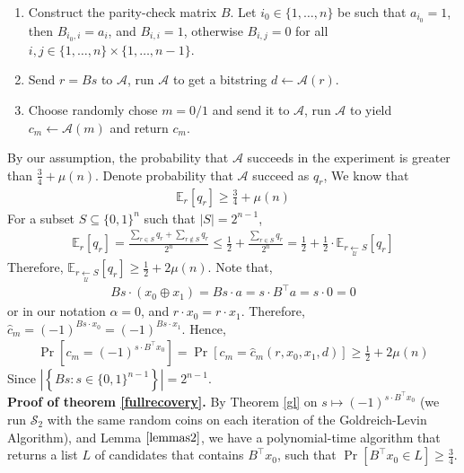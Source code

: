 \documentclass{article}
\begin{document}
\begin{enumerate}
    \item Construct the parity-check matrix $B$. Let $i_{0}\in\{1,\dots,n\}$ be such that $a_{i_{0}}=1$, then $B_{i_{0},i}=a_{i}$, and $B_{i,i}=1$, otherwise $B_{i,j}=0$ for all $i,j\in \{1,\dots,n\}\times \{1,\dots,n-1\}$.
    \item Send $r=Bs$ to $\mathcal{A}$, run $\mathcal{A}$ to get a bitstring $d\leftarrow \mathcal{A}(r)$.
    \item Choose randomly chose $m=0/1$ and send it to $\mathcal{A}$, run $\mathcal{A}$ to yield $c_{m}\leftarrow\mathcal{A}(m)$ and return $c_{m}$.
\end{enumerate}
By our assumption, the probability that $\mathcal{A}$ succeeds in the experiment is greater than $\frac{3}{4}+\mu(n)$. Denote probability that $\mathcal{A}$ succeed as $q_{r}$, We know that \begin{align}\mathbb{E}_{r}[q_{r}] \geq \frac{3}{4}+\mu(n)\end{align}  For a subset $S\subseteq \{0,1\}^{n}$ such that $|S|=2^{n-1}$,
\begin{align}\mathbb{E}_{r}[q_{r}] = \frac{\sum_{r\in S}{q_{r}} + \sum_{r\notin S}{q_{r}}}{2^{n}} \leq \frac{1}{2} + \frac{\sum_{r\in S}{q_{r}}}{2^{n}} = \frac{1}{2} + \frac{1}{2}\cdot \mathbb{E}_{r\underset{\mathcal{U}}{\leftarrow} S}[q_{r}]\end{align}  Therefore, $\mathbb{E}_{r\underset{\mathcal{U}}{\leftarrow} S}[q_{r}] \geq \frac{1}{2} + 2\mu(n)$.
Note that,
\begin{align}Bs \cdot (x_{0} \oplus x_{1}) = Bs \cdot a = s \cdot B^{\top} a = s\cdot 0 = 0\end{align}  or in our notation $\alpha = 0$, and $r\cdot x_{0} = r\cdot x_{1}$.
Therefore, $\hat{c}_{m} = (-1)^{Bs\cdot x_{0}} = (-1)^{Bs\cdot x_{1}}$. Hence,
\begin{align}\Pr[c_{m}=(-1)^{s\cdot B^{\top}x_{0}}]=\Pr[c_{m} = \hat{c}_{m}(r,x_{0},x_{1},d)]\geq\frac{1}{2}+2\mu(n) \end{align}  Since $\left|\left\{Bs: s\in \{0,1\}^{n-1}\right\}\right| = 2^{n-1}$.\\
\textbf{Proof of theorem \ref{fullrecovery}.} 
By Theorem \ref{gl} on $s\mapsto (-1)^{s\cdot B^{\top}x_{0}}$ (we run $\mathcal{S}_{2}$ with the same random coins on each iteration of the Goldreich-Levin Algorithm), and Lemma $\ref{lemmas2}$, we have a polynomial-time algorithm that returns a list $L$ of candidates that contains  $B^{\top}x_{0}$, such that $\Pr[B^{\top}x_{0}\in L]\geq \frac{3}{4}$.
\end{document}
